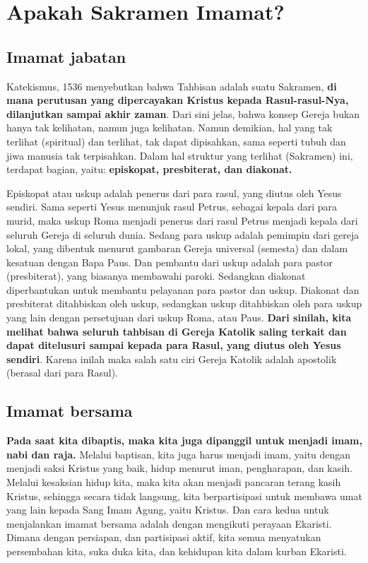 \section*{Apakah Sakramen Imamat?}

\subsection*{Imamat jabatan}

Katekismus, 1536 menyebutkan bahwa Tahbisan adalah suatu Sakramen, \textbf{di mana perutusan yang dipercayakan Kristus kepada Rasul-rasul-Nya, dilanjutkan sampai akhir zaman}. Dari sini jelas, bahwa konsep Gereja bukan hanya tak kelihatan, namun juga kelihatan. Namun demikian, hal yang tak terlihat (spiritual) dan terlihat, tak dapat dipisahkan, sama seperti tubuh dan jiwa manusia tak terpisahkan. Dalam hal struktur yang terlihat (Sakramen) ini, terdapat bagian, yaitu: \textbf{episkopat, presbiterat, dan diakonat.}

Episkopat atau uskup adalah penerus dari para rasul, yang diutus oleh Yesus sendiri. Sama seperti Yesus menunjuk rasul Petrus, sebagai kepala dari para murid, maka uskup Roma menjadi penerus dari rasul Petrus menjadi kepala dari seluruh Gereja di seluruh dunia. Sedang para uskup adalah pemimpin dari gereja lokal, yang dibentuk menurut gambaran Gereja universal (semesta) dan dalam kesatuan dengan Bapa Paus. Dan pembantu dari uskup adalah para pastor (presbiterat), yang biasanya membawahi paroki. Sedangkan diakonat diperbantukan untuk membantu pelayanan para pastor dan uskup. Diakonat dan presbiterat ditahbiskan oleh uskup, sedangkan uskup ditahbiskan oleh para uskup yang lain dengan persetujuan dari uskup Roma, atau Paus. \textbf{Dari sinilah, kita melihat bahwa seluruh tahbisan di Gereja Katolik saling terkait dan dapat ditelusuri sampai kepada para Rasul, yang diutus oleh Yesus sendiri}. Karena inilah maka salah satu ciri Gereja Katolik adalah apostolik (berasal dari para Rasul).

\subsection*{Imamat bersama}

\textbf{Pada saat kita dibaptis, maka kita juga dipanggil untuk menjadi imam, nabi dan raja.} Melalui baptisan, kita juga harus menjadi imam, yaitu dengan menjadi saksi Kristus yang baik, hidup menurut iman, pengharapan, dan kasih. Melalui kesaksian hidup kita, maka kita akan menjadi pancaran terang kasih Kristus, sehingga secara tidak langsung, kita berpartisipasi untuk membawa umat yang lain kepada Sang Imam Agung, yaitu Kristus. Dan cara kedua untuk menjalankan imamat bersama adalah dengan mengikuti perayaan Ekaristi. Dimana dengan persiapan, dan partisipasi aktif, kita semua menyatukan persembahan kita, suka duka kita, dan kehidupan kita dalam kurban Ekaristi.


